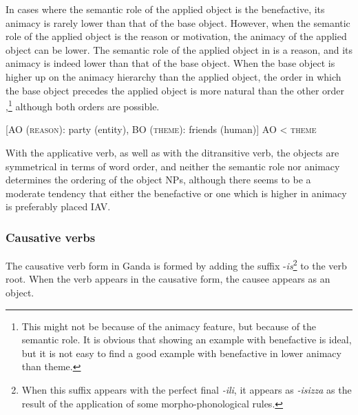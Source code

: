 \documentclass[output=paper,
            colorlinks, citecolor=brown
            ,draftmode
		  ]{langscibook}
\begin{document}
    In cases where the semantic role of the applied object is the benefactive, its animacy is rarely lower than that of the base object. However, when the semantic role of the applied object is the reason or motivation, the animacy of the applied object can be lower. The semantic role of the applied object in  is a reason, and its animacy is indeed lower than that of the base object. When the base object is higher up on the animacy hierarchy than the applied object, the order in which the base object precedes the applied object  is more natural than the other order ,\footnote{This might not be because of the animacy feature, but because of the semantic role. It is obvious that showing an example with benefactive is ideal, but it is not easy to find a good example with benefactive in lower animacy than theme.} although both orders are possible. 

\ea%
    \label{ex:yoneda:14}
    [AO (\textsc{reason}): party (entity), BO (\textsc{theme}): friends (human)]  AO < \textsc{theme} 
    \z
\z

        
         

     With the applicative verb, as well as with the ditransitive verb, the objects are symmetrical in terms of word order, and neither the semantic role nor animacy determines the ordering of the object NPs, although there seems to be a moderate tendency that either the benefactive or one which is higher in animacy is preferably placed IAV. 


\subsubsection{Causative verbs}\label{sec:yoneda:3.1.3}



The causative verb form in Ganda is formed by adding the suffix -\textit{is}\footnote{When this suffix appears with the perfect final \textit{{}-ili}, it appears as \textit{{}-isizza} as the result of the application of some morpho-phonological rules.}  to the verb root. When the verb appears in the causative form, the causee appears as an object. 
\end{document}
